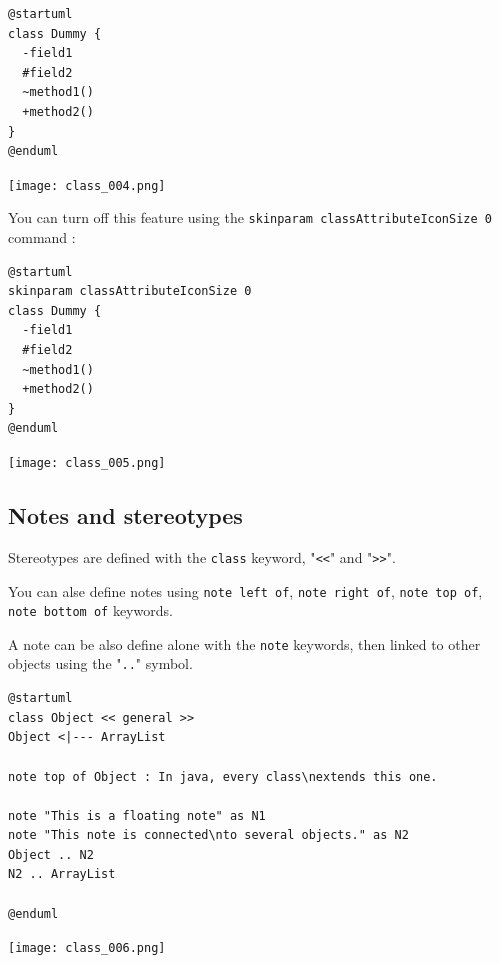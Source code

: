 \vskip 10mm

\begin{lstlisting}
@startuml
class Dummy {
  -field1
  #field2
  ~method1()
  +method2()
}
@enduml
\end{lstlisting}

\begin{center}
\texttt{[image: class\_004.png]}
\end{center}

\vskip 10mm

\begin{description}
\item You can turn off this feature using the
\texttt{skinparam classAttributeIconSize 0} command :
\end{description}

\begin{lstlisting}
@startuml
skinparam classAttributeIconSize 0
class Dummy {
  -field1
  #field2
  ~method1()
  +method2()
}
@enduml
\end{lstlisting}
\begin{center}
\texttt{[image: class\_005.png]}
\end{center}


\newpage \subsection{Notes and stereotypes}

\begin{description}
\item Stereotypes are defined with the \texttt{class} keyword, "\texttt{<<}" and
"\texttt{>>}".
\item You can alse define notes using \texttt{note left of},
\texttt{note right of}, \texttt{note top of}, \texttt{note bottom of} keywords.
\item A note can be also define alone with the \texttt{note} keywords, then linked to
other objects using the "\texttt{..}" symbol.
\end{description}

\begin{lstlisting}
@startuml
class Object << general >>
Object <|--- ArrayList

note top of Object : In java, every class\nextends this one.

note "This is a floating note" as N1
note "This note is connected\nto several objects." as N2
Object .. N2
N2 .. ArrayList

@enduml
\end{lstlisting}
\begin{center}
\texttt{[image: class\_006.png]}
\end{center}

